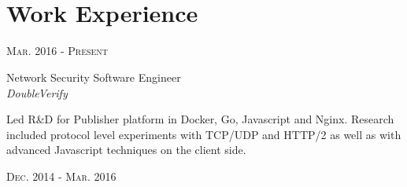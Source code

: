 \documentclass[10pt]{article} %
\begin{document}
\color{text1} %


\par{\\ %
\par{}\\
	

\begin{minipage}[t]{0.5\textwidth} %
\vspace{0pt} %
	

\section{Work Experience} 


{\raggedleft\textsc{Mar. 2016 - Present}\par}

{\raggedright\large Network Security Software Engineer\\
\textit{DoubleVerify}\\[5pt]}

\small{Led R\&D for Publisher platform in Docker, Go, Javascript and Nginx. Research included protocol level experiments with TCP/UDP and HTTP/2 as well as with advanced Javascript techniques on the client side.}\\


{\raggedleft\textsc{Dec. 2014 - Mar. 2016}\par}


\end{minipage}}
\end{document}
